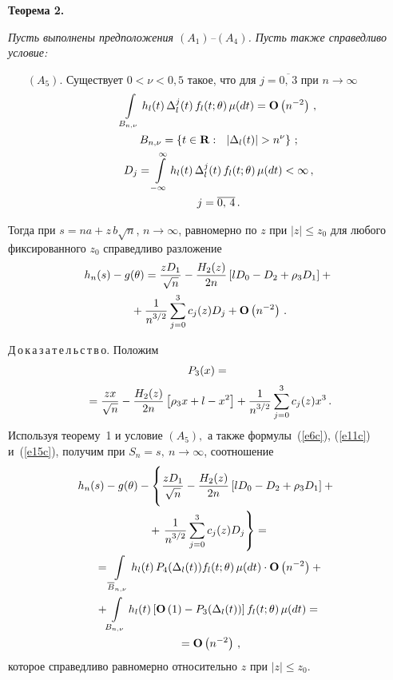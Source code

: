 \begin{multicols}{2}
\noindent
{\bf Теорема 2.} {\it Пусть выполнены предположения
  $(A_1)$--$(A_4)$. Пусть также справедливо условие:
  {\addtolength{\leftmargini}{10pt}
  \begin{itemize}
  \item[\sffamily $(A_5).$]
  Существует $0<\nu<0{,}5$ такое, что для $j=\overline{0,\,3}$
  при $n\rightarrow\infty$
  \begin{gather} 
\int\limits_{B_{n,\nu}}  h_l(t)\, \Delta_l^j(t)\,
     f_l(t;\theta)\, \mu(dt)={\bf O}\left(n^{-2}\right)\,,\notag\\
B_{n,\nu}=\left\{t\in{\bf R}:~~|\Delta_l(t)|>n^{\nu}\right\}\,;\notag\\
 D_j=\int\limits_{-\infty}^\infty
     h_l(t)\, \Delta_l^j(t)\, f_l(t;\theta)\,
\mu(dt)<\infty\,,\notag\\
j=\overline{0,\,4}\,.\label{e15c}
\end{gather}
   \end{itemize}}
   Тогда при $s=na+z\, b\sqrt{n}$, $n\rightarrow\infty$,
  равномерно по $z$ при $|z|\le z_0$ для любого фиксированного $z_0$
  справедливо разложение
  \begin{multline*} 
h_n(s)-g(\theta)=\displaystyle\frac{\displaystyle zD_1\mathstrut}{\displaystyle \sqrt{n}\mathstrut}-
     \displaystyle\frac{\displaystyle H_2(z)\mathstrut}{\displaystyle 2n\mathstrut}\left[lD_0-D_2+\rho_3D_1\right]+{}\\
     {}+
     \displaystyle\frac{\displaystyle 1\mathstrut}{\displaystyle n^{3/2}\mathstrut} \sum_{j=0}^3 c_j(z)D_j+
     {\bf O}\left(n^{-2}\right)\,.
  \end{multline*}
  }
\pagebreak

  
\noindent
Д\,о\,к\,а\,з\,а\,т\,е\,л\,ь\,с\,т\,в\,о. 
Положим   
\begin{multline*}   
P_3(x)={}\\[2pt]
{}= \displaystyle\frac{\displaystyle zx\mathstrut}{\displaystyle \sqrt{n}\mathstrut}- \displaystyle\frac{\displaystyle H_2(z)\mathstrut}{\displaystyle 2n\mathstrut} \left[\rho_3 x+l-x^2 \right]+
       \displaystyle\frac{\displaystyle 1\mathstrut}{\displaystyle n^{3/2}\mathstrut}\sum_{j=0}^3 c_j(z)x^3\,.
\end{multline*}
 Используя теорему~1 и условие $(A_5),$ а также формулы~(\ref{e6c}),
  (\ref{e11c}) и~(\ref{e15c}), получим при
  $S_n=s,~n\rightarrow\infty$, соотношение
  \begin{multline*}   
\!\!h_n(s)-g(\theta)-\left\{\vphantom{\sum_{j=0}^3}
 \fr{zD_1}{\sqrt{n}}-
     \fr{H_2(z)}{2n}\left[lD_0-D_2+\rho_3D_1\right]+{}\right.\\
     {}+\left.
     \fr{1}{n^{3/2}} \sum_{j=0}^3 c_j(z)D_j\right\}={}\\
{}=\int\limits_{\overline{B}_{n,\nu}}
      h_l(t)\, P_4(\Delta_l(t)) f_l(t;\theta)\,
     \mu(dt)\cdot {\bf O}\left(n^{-2}\right)+{}\\
{}     \! +\!\int\limits_{B_{n,\nu}}
      h_l(t) \left[{\bf O}\left(1\right)-P_3(\Delta_l(t)) \right]
      f_l(t;\theta)\,\mu(dt)={}\\
      {}= {\bf O}\left(n^{-2}\right)\,,
\end{multline*}
  которое справедливо равномерно относительно $z$ при $|z|\le z_0$.


\end{multicols}

